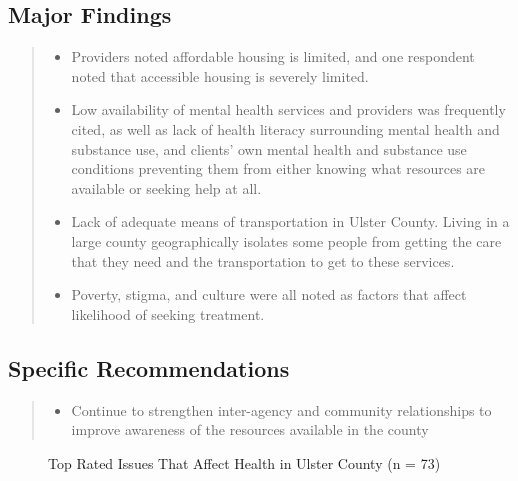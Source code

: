 \documentclass[
  english,
  letterpaper,
]{report}
\providecommand{\tightlist}{%
  \setlength{\itemsep}{0pt}\setlength{\parskip}{0pt}}
\begin{document}
\subsection{Major Findings}\label{major-findings-5}

\begin{quote}
\begin{itemize}
\item
  Providers noted affordable housing is limited, and one respondent
  noted that accessible housing is severely limited.
\item
  Low availability of mental health services and providers was
  frequently cited, as well as lack of health literacy surrounding
  mental health and substance use, and clients' own mental health and
  substance use conditions preventing them from either knowing what
  resources are available or seeking help at all.
\item
  Lack of adequate means of transportation in Ulster County. Living in a
  large county geographically isolates some people from getting the care
  that they need and the transportation to get to these services.
\item
  Poverty, stigma, and culture were all noted as factors that affect
  likelihood of seeking treatment.
\end{itemize}
\end{quote}

\subsection{Specific Recommendations}\label{specific-recommendations-4}

\begin{quote}
\begin{itemize}
\tightlist
\item
  Continue to strengthen inter-agency and community relationships to
  improve awareness of the resources available in the county
\end{itemize}
\end{quote}

\begin{figure}


\caption{\label{fig-uc-affect-health}Top Rated Issues That Affect Health
in Ulster County (n = 73)}

\end{figure}%
\end{document}
